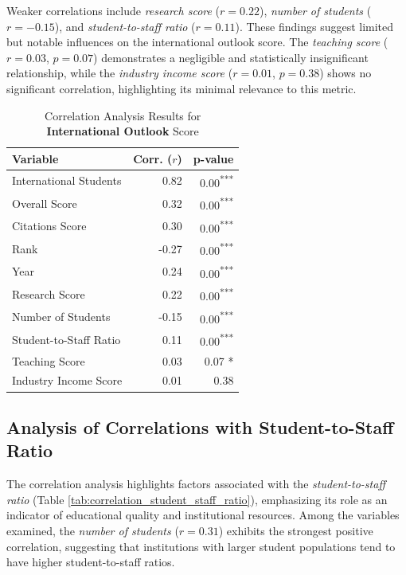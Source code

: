 \documentclass[conference]{IEEEtran}
\begin{document}
Weaker correlations include \textit{research score} ($r = 0.22$), \textit{number of students} ($r = -0.15$), and \textit{student-to-staff ratio} ($r = 0.11$). These findings suggest limited but notable influences on the international outlook score. The \textit{teaching score} ($r = 0.03$, $p = 0.07$) demonstrates a negligible and statistically insignificant relationship, while the \textit{industry income score} ($r = 0.01$, $p = 0.38$) shows no significant correlation, highlighting its minimal relevance to this metric.

\begin{table}[h!]
	\centering
	\caption{Correlation Analysis Results for \textbf{International Outlook} Score}
	\label{tab:correlation_international_outlook}
	\begin{tabular}{|l|r|r|}
		\hline
		\textbf{Variable} & \textbf{Corr. ($r$)} & \textbf{p-value} \\
		\hline
		International Students & 0.82 & 0.00\textsuperscript{***} \\
		Overall Score & 0.32 & 0.00\textsuperscript{***} \\
		Citations Score & 0.30 & 0.00\textsuperscript{***} \\
		Rank & -0.27 & 0.00\textsuperscript{***} \\
		Year & 0.24 & 0.00\textsuperscript{***} \\
		Research Score & 0.22 & 0.00\textsuperscript{***} \\
		Number of Students & -0.15 & 0.00\textsuperscript{***} \\
		Student-to-Staff Ratio & 0.11 & 0.00\textsuperscript{***} \\
		Teaching Score & 0.03 & 0.07 * \\
		Industry Income Score & 0.01 & 0.38 \\
		\hline
	\end{tabular}
\end{table}


\subsection{Analysis of Correlations with Student-to-Staff Ratio}

The correlation analysis highlights factors associated with the \textit{student-to-staff ratio} (Table \ref{tab:correlation_student_staff_ratio}), emphasizing its role as an indicator of educational quality and institutional resources. Among the variables examined, the \textit{number of students} ($r = 0.31$) exhibits the strongest positive correlation, suggesting that institutions with larger student populations tend to have higher student-to-staff ratios.
\end{document}
